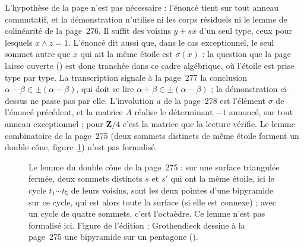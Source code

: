 \begin{remarque}
L'hypothèse  de la page n'est pas nécessaire : l'énoncé tient sur tout anneau commutatif, et la démonstration n'utilise ni les corps résiduels ni le lemme de colinéarité de la page~276. Il suffit des voisins $y + sx$ d'un seul type, ceux pour lesquels $x \wedge z = 1$. L'énoncé dit aussi que, dans le cas exceptionnel, le seul sommet autre que $\dot x$ qui ait la même étoile est $\sigma(\dot x)$ : la question que la page laisse ouverte () est donc tranchée dans ce cadre algébrique, où l'étoile est prise type par type. La transcription signale à la page~277 la conclusion $\alpha - \beta \in \pm(\alpha - \beta)$, qui doit se lire $\alpha + \beta \in \pm(\alpha - \beta)$ ; la démonstration ci-dessus ne passe pas par elle. L'involution $a$ de la page~278 est l'élément $\sigma$ de l'énoncé précédent, et la matrice $A$ réalise le déterminant $-1$ annoncé, sur tout anneau exceptionnel ; pour $\mathbf Z/4$ c'est la matrice que la lecture vérifie. Le lemme combinatoire de la page~275 (deux sommets distincts de même étoile forment un double cône, figure~\ref{fig:79-double-cone}) n'est pas formalisé.
\end{remarque}

\begin{figure}[htbp]
\centering
{}
\caption{Le lemme du double cône de la page~275 : sur une surface triangulée fermée, deux sommets distincts $s$ et $s'$ qui ont la même étoile, ici le cycle $t_1 \cdots t_5$ de leurs voisins, sont les deux pointes d'une bipyramide sur ce cycle, qui est alors toute la surface (si elle est connexe) ; avec un cycle de quatre sommets, c'est l'octaèdre. Ce lemme n'est pas formalisé ici. Figure de l'édition ; Grothendieck dessine à la page~275 une bipyramide sur un pentagone ().}
\label{fig:79-double-cone}
\end{figure}

